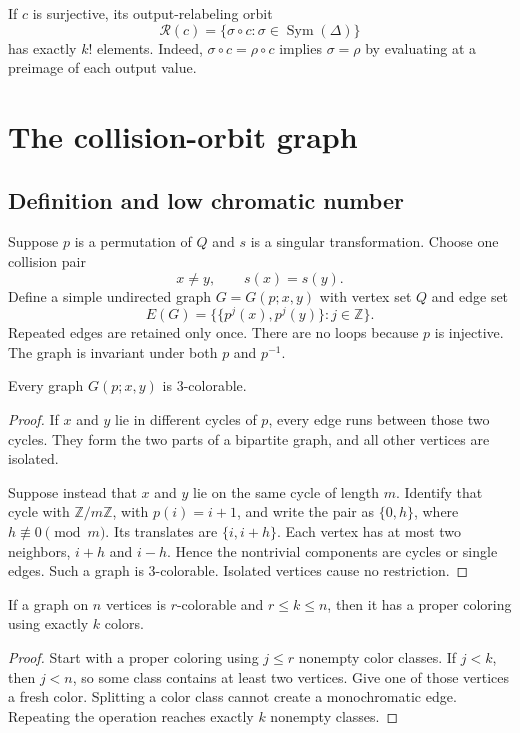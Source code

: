 \documentclass[11pt,a4paper]{article}
\numberwithin{equation}{section}
\theoremstyle{definition}
\theoremstyle{remark}
\newcommand{\Z}{\mathbb Z}
\newcommand{\D}{\Delta}
\newcommand{\Sym}{\operatorname{Sym}}
\begin{document}
If $c$ is surjective, its output-relabeling orbit
\[
 \mathcal R(c)=\{\sigma\circ c:\sigma\in\Sym(\D)\}
\]
has exactly $k!$ elements. Indeed, $\sigma\circ c=\rho\circ c$ implies
$\sigma=\rho$ by evaluating at a preimage of each output value.

\section{The collision-orbit graph}\label{sec:graph}

\subsection{Definition and low chromatic number}

Suppose $p$ is a permutation of $Q$ and $s$ is a singular transformation.
Choose one collision pair
\[
 x\ne y,\qquad s(x)=s(y).
\]
Define a simple undirected graph $G=G(p;x,y)$ with vertex set $Q$ and edge set
\begin{equation}\label{eq:orbitgraph}
 E(G)=\bigl\{\{p^j(x),p^j(y)\}:j\in\Z\bigr\}.
\end{equation}
Repeated edges are retained only once. There are no loops because $p$ is
injective. The graph is invariant under both $p$ and $p^{-1}$.

\begin{lemma}\label{lem:threecolor}
Every graph $G(p;x,y)$ is $3$-colorable.
\end{lemma}
\begin{proof}
If $x$ and $y$ lie in different cycles of $p$, every edge runs between those
two cycles. They form the two parts of a bipartite graph, and all other
vertices are isolated.

Suppose instead that $x$ and $y$ lie on the same cycle of length $m$.
Identify that cycle with $\Z/m\Z$, with $p(i)=i+1$, and write the pair as
$\{0,h\}$, where $h\not\equiv0\pmod m$. Its translates are
$\{i,i+h\}$. Each vertex has at most two neighbors, $i+h$ and $i-h$.
Hence the nontrivial components are cycles or single edges. Such a graph is
$3$-colorable. Isolated vertices cause no restriction.
\end{proof}

\begin{lemma}\label{lem:refine}
If a graph on $n$ vertices is $r$-colorable and $r\le k\le n$, then it has a
proper coloring using exactly $k$ colors.
\end{lemma}
\begin{proof}
Start with a proper coloring using $j\le r$ nonempty color classes. If
$j<k$, then $j<n$, so some class contains at least two vertices. Give one of
those vertices a fresh color. Splitting a color class cannot create a
monochromatic edge. Repeating the operation reaches exactly $k$ nonempty
classes.
\end{proof}
\end{document}
